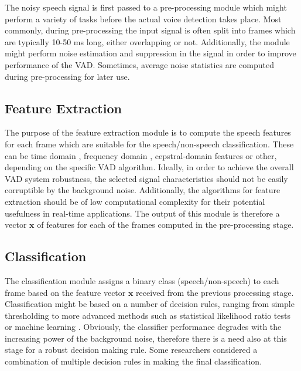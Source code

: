 The noisy speech signal is first passed to a pre-processing module which might perform a variety of tasks before the actual voice detection takes place. Most commonly, during pre-processing the input signal is often split into frames which are typically 10-50 ms long, either overlapping or not. Additionally, the module might perform noise estimation and suppression in the signal in order to improve performance of the VAD. Sometimes, average noise statistics are computed during pre-processing for later use.

\subsection{Feature Extraction}

The purpose of the feature extraction module is to compute the speech features for each frame which are suitable for the speech/non-speech classification. These can be time domain \cite{Kida, Weaver}, frequency domain \cite{Tuske, LTSD, Tan, PARADE, RamirezMulti, Sohn, SohnInitial, Renevey}, cepstral-domain \cite{Kotcher} features or other, depending on the specific VAD algorithm. Ideally, in order to achieve the overall VAD system robustness, the selected signal characteristics should not be easily corruptible by the background noise. Additionally, the algorithms for feature extraction should be of low computational complexity for their potential usefulness in real-time applications. The output of this module is therefore a vector $\mathbf{x}$ of features for each of the frames computed in the pre-processing stage.

\subsection{Classification}

The classification module assigns a binary class (speech/non-speech) to each frame based on the feature vector $\mathbf{x}$ received from the previous processing stage. Classification might be based on a number of decision rules, ranging from simple thresholding \cite{G729} to more advanced methods such as statistical likelihood ratio tests \cite{Sohn, ImprovedLikelihood, SohnInitial} or machine learning \cite{XiaoLei, Stadtschnitzer}. Obviously, the classifier performance degrades with the increasing power of the background noise, therefore there is a need also at this stage for a robust decision making rule. Some researchers \cite{Kida} considered a combination of multiple decision rules in making the final classification.

